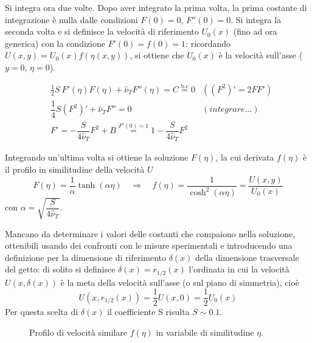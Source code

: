 \begin{itemize}
 Si integra ora due volte. Dopo aver integrato la prima volta, la prima
 costante di integrazione è nulla dalle condizioni $F(0)=0$, $F''(0)=0$.
 Si integra la seconda volta e si definisce la velocità di riferimento
 $U_0(x)$ (fino ad ora generica) con la condizione $F'(0) = f(0) = 1$:
 ricordando $U(x,y) = U_0(x) f(\eta(x,y))$, si ottiene che $U_0(x)$ è
 la velocità sull'asse ($y=0$, $\eta=0$).
 
 \begin{equation}
 \begin{aligned}
 & \frac{1}{2}S\ F'(\eta)F(\eta) + \hat{\nu}_T F''(\eta) = C 
    \stackrel{\text{b.c}}{=}0  & ( (F^2)' = 2FF') \\
 & \dfrac{1}{4} S (F^2)' + \hat{\nu}_T F'' = 0 & ( integrare ...)  \\
 & F' = -\dfrac{S}{4\hat{\nu}_T} F^2 + B \stackrel{F'(0)=1}{=} 
  1 - \dfrac{S}{4\hat{\nu}_T} F^2 & 
 \end{aligned}
 \end{equation}

 Integrando un'ultima volta si ottiene la soluzione $F(\eta)$, la cui 
 derivata $f(\eta)$ è il profilo in similitudine della velocità $U$
 \begin{equation}
  F(\eta) = \dfrac{1}{\alpha}\tanh{(\alpha \eta)} \quad \Rightarrow \quad
  f(\eta) = \dfrac{1}{\cosh^2{(\alpha \eta)}} = \dfrac{U(x,y)}{U_0(x)}
 \end{equation}
 con $\alpha = \sqrt{\dfrac{S}{4\hat{\nu}_T}}$.

 Mancano da determinare
 i valori delle costanti che compaiono nella soluzione, ottenibili usando
 dei confronti con le misure sperimentali e
 introducendo una definizione per la dimensione di riferimento $\delta(x)$ 
 della dimensione trasversale del getto: di solito si definisce 
 $\delta(x) = r_{1/2}(x)$ l'ordinata in cui la velocità $U(x,\delta(x))$
 è la meta
 della velocità sull'asse (o sul piano di simmetria), cioè
 \begin{equation}
   U(x,r_{1/2}(x)) = \dfrac{1}{2}U(x,0) = \dfrac{1}{2}U_0(x)
 \end{equation}
 Per questa scelta di $\delta(x)$ il coefficiente S risulta $S \sim 0.1$.
 

\begin{figure}
\begin{center}
\end{center}
\caption*{Profilo di velocità similare $f(\eta)$ in variabile di
  similitudine $\eta$.}
\end{figure}




\end{itemize}
